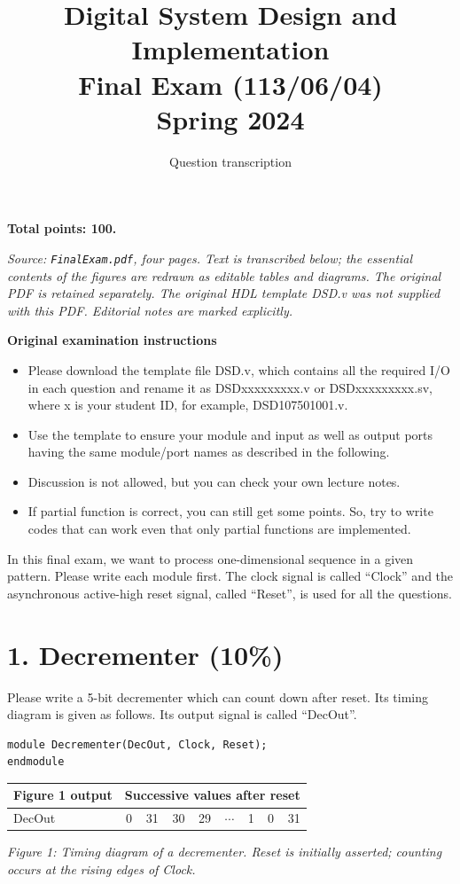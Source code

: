 \documentclass[11pt,a4paper]{article}
\title{Digital System Design and Implementation\\Final Exam (113/06/04)\\Spring 2024}
\author{Question transcription}
\date{}
\begin{document}
\maketitle
\textbf{Total points: 100.}

\textit{Source: \texttt{FinalExam.pdf}, four pages. Text is transcribed below; the essential contents of the figures are redrawn as editable tables and diagrams. The original PDF is retained separately. The original HDL template DSD.v was not supplied with this PDF. Editorial notes are marked explicitly.}

\textbf{Original examination instructions}
\begin{itemize}[nosep]
\item Please download the template file DSD.v, which contains all the required I/O in each question and rename it as DSDxxxxxxxxx.v or DSDxxxxxxxxx.sv, where x is your student ID, for example, DSD107501001.v.
\item Use the template to ensure your module and input as well as output ports having the same module/port names as described in the following.
\item Discussion is not allowed, but you can check your own lecture notes.
\item If partial function is correct, you can still get some points. So, try to write codes that can work even that only partial functions are implemented.
\end{itemize}

In this final exam, we want to process one-dimensional sequence in a given pattern. Please write each module first. The clock signal is called ``Clock'' and the asynchronous active-high reset signal, called ``Reset'', is used for all the questions.

\section*{1. Decrementer (10\%)}
Please write a 5-bit decrementer which can count down after reset. Its timing diagram is given as follows. Its output signal is called ``DecOut''.
\par\medskip\noindent\begin{minipage}{\linewidth}
\begin{lstlisting}
module Decrementer(DecOut, Clock, Reset);
endmodule
\end{lstlisting}
\end{minipage}\par
\begin{center}
\begin{tabular}{lrrrrrrrr}
\toprule
Figure 1 output & \multicolumn{8}{c}{Successive values after reset}\\
\midrule
DecOut & 0 & 31 & 30 & 29 & $\cdots$ & 1 & 0 & 31\\
\bottomrule
\end{tabular}
\end{center}
\textit{Figure 1: Timing diagram of a decrementer. Reset is initially asserted; counting occurs at the rising edges of Clock.}
\end{document}
